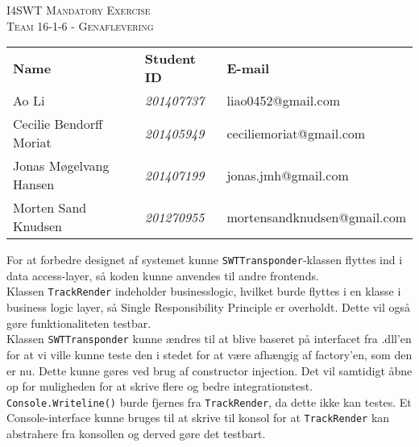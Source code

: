 


	
	\begin{center}
		\textsc{\large I4SWT Mandatory Exercise}\\[0.5cm]
		
		\textsc{\Large Team 16-1-6 - Genaflevering}\\
		\begin{center}
			\begin{tabular}{l l l}
				\textbf{Name} & \textbf{Student ID} & \textbf{E-mail} \\
				Ao Li & \textsl{201407737} &  liao0452@gmail.com  \\
				Cecilie Bendorff Moriat & \textsl{201405949} & ceciliemoriat@gmail.com \\
				Jonas Møgelvang Hansen & \textsl{201407199} & jonas.jmh@gmail.com \\
				Morten Sand Knudsen & \textsl{201270955} & mortensandknudsen@gmail.com \\
				
			\end{tabular}
		\end{center}
	\end{center}
	
	For at forbedre designet af systemet kunne \texttt{SWTTransponder}-klassen flyttes ind i data access-layer, så koden kunne anvendes til andre frontends. \\
	Klassen \texttt{TrackRender} indeholder businesslogic, hvilket burde flyttes i en klasse i business logic layer, så Single Responsibility Principle er overholdt. Dette vil også gøre funktionaliteten testbar.\\
	Klassen \texttt{SWTTransponder} kunne ændres til at blive baseret på interfacet fra .dll'en for at vi ville kunne teste den i stedet for at være afhængig af factory'en, som den er nu. Dette kunne gøres ved brug af constructor injection. Det vil samtidigt åbne op for muligheden for at skrive flere og bedre integrationstest.\\
	\texttt{Console.Writeline()} burde fjernes fra \texttt{TrackRender}, da dette ikke kan testes. Et Console-interface kunne bruges til at skrive til konsol for at \texttt{TrackRender} kan abstrahere fra konsollen og derved gøre det testbart.
